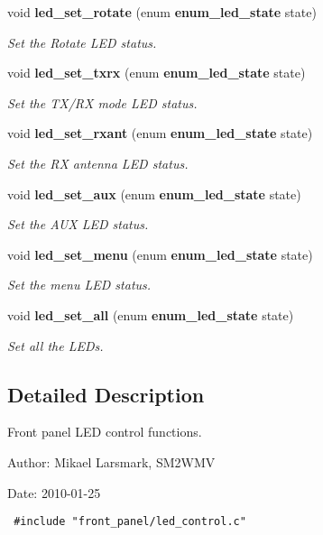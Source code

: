 \begin{CompactItemize}
void {\bf led\_\-set\_\-rotate} (enum {\bf enum\_\-led\_\-state} state)
\begin{CompactList}\small\item\em Set the Rotate LED status. \item\end{CompactList}\item 
void {\bf led\_\-set\_\-txrx} (enum {\bf enum\_\-led\_\-state} state)
\begin{CompactList}\small\item\em Set the TX/RX mode LED status. \item\end{CompactList}\item 
void {\bf led\_\-set\_\-rxant} (enum {\bf enum\_\-led\_\-state} state)
\begin{CompactList}\small\item\em Set the RX antenna LED status. \item\end{CompactList}\item 
void {\bf led\_\-set\_\-aux} (enum {\bf enum\_\-led\_\-state} state)
\begin{CompactList}\small\item\em Set the AUX LED status. \item\end{CompactList}\item 
void {\bf led\_\-set\_\-menu} (enum {\bf enum\_\-led\_\-state} state)
\begin{CompactList}\small\item\em Set the menu LED status. \item\end{CompactList}\item 
void {\bf led\_\-set\_\-all} (enum {\bf enum\_\-led\_\-state} state)
\begin{CompactList}\small\item\em Set all the LEDs. \item\end{CompactList}\end{CompactItemize}


\subsection{Detailed Description}
Front panel LED control functions. 

\begin{Desc}
\item[Author:]Mikael Larsmark, SM2WMV \end{Desc}
\begin{Desc}
\item[Date:]2010-01-25 

\begin{Code}\begin{verbatim} #include "front_panel/led_control.c" 
\end{verbatim}
\end{Code}

 \end{Desc}


